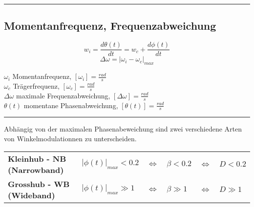 \hrule
\subsection{Momentanfrequenz, Frequenzabweichung}
\begin{minipage}[t]{10cm}
	$$ w_i = \frac{d \theta(t)}{dt} = w_c + \frac{d \phi(t)}{dt} $$
	$$ \Delta \omega = \left| \omega_i - \omega_c \right|_{max} $$
\end{minipage}
\begin{minipage}[t]{8cm}
	$\omega_i$ Momentanfrequenz, $[\omega_i] = \frac{rad}{s}$ \\
	$\omega_c$ Trägerfrequenz, $[\omega_c] = \frac{rad}{s}$ \\
	$\Delta \omega$ maximale Frequenzabweichung, $[\Delta \omega] = \frac{rad}{s}$ \\
	$\theta(t)$ momentane Phasenabweichung, $[\theta(t)] = \frac{rad}{s}$\\
\end{minipage}

\hrule
{}
Abhängig von der maximalen Phasenabeweichung sind zwei verschiedene Arten von Winkelmodulationnen zu
unterscheiden. \\

\begin{tabular}{llll}
\textbf{Kleinhub - NB (Narrowband)} 
	& $|\phi(t)|_{max} < 0.2$ 
	& $\Leftrightarrow \quad \beta < 0.2$
	& $\Leftrightarrow \quad D < 0.2$ \\

\textbf{Grosshub - WB (Wideband)}
 & $|\phi(t)|_{max} \gg 1$
 & $\Leftrightarrow \quad \beta \gg 1$
 & $\Leftrightarrow \quad D \gg 1$ \\

\end{tabular}
 
\newpage


